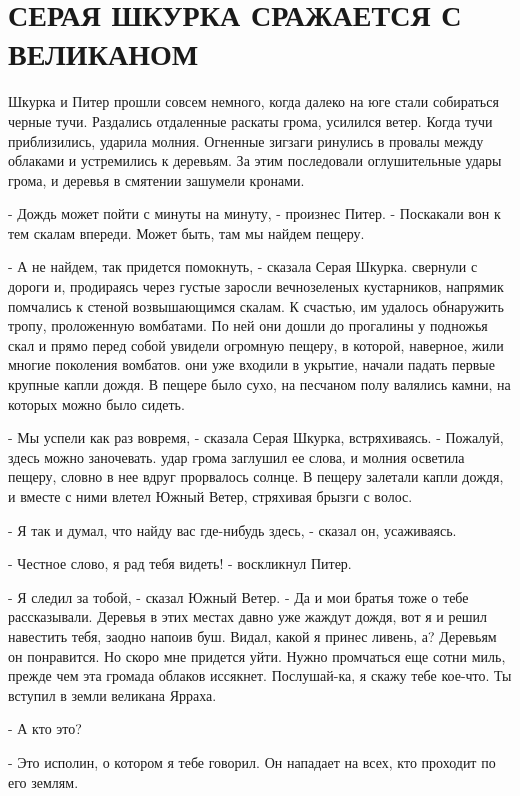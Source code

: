 \chapter{СЕРАЯ ШКУРКА СРАЖАЕТСЯ С ВЕЛИКАНОМ}
\par{} Шкурка и Питер прошли совсем немного, когда далеко на юге 
стали собираться черные тучи. Раздались отдаленные раскаты грома, 
усилился ветер. Когда тучи приблизились, ударила молния. Огненные 
зигзаги ринулись в провалы между облаками и устремились к деревьям. За 
этим последовали оглушительные удары грома, и деревья в смятении 
зашумели кронами.
\par- Дождь может пойти с минуты на минуту, - произнес Питер. - 
Поскакали вон к тем скалам впереди. Может быть, там мы найдем пещеру.
\par- А не найдем, так придется помокнуть, - сказала Серая Шкурка.
 свернули с дороги и, продираясь через густые заросли 
вечнозеленых кустарников, напрямик помчались к стеной возвышающимся 
скалам. К счастью, им удалось обнаружить тропу, проложенную вомбатами. 
По ней они дошли до прогалины у подножья скал и прямо перед собой 
увидели огромную пещеру, в которой, наверное, жили многие поколения 
вомбатов.
 они уже входили в укрытие, начали падать первые крупные 
капли дождя. В пещере было сухо, на песчаном полу валялись камни, на 
которых можно было сидеть.
\par- Мы успели как раз вовремя, - сказала Серая Шкурка, встряхиваясь. 
- Пожалуй, здесь можно заночевать.
 удар грома заглушил ее слова, и молния осветила пещеру, 
словно в нее вдруг прорвалось солнце. В пещеру залетали капли дождя, и 
вместе с ними влетел Южный Ветер, стряхивая брызги с волос.
\par- Я так и думал, что найду вас где-нибудь здесь, - сказал он, 
усаживаясь.
\par- Честное слово, я рад тебя видеть! - воскликнул Питер.
\par- Я следил за тобой, - сказал Южный Ветер. - Да и мои братья тоже 
о тебе рассказывали. Деревья в этих местах давно уже жаждут дождя, вот 
я и решил навестить тебя, заодно напоив буш. Видал, какой я принес 
ливень, а? Деревьям он понравится. Но скоро мне придется уйти. Нужно 
промчаться еще сотни миль, прежде чем эта громада облаков иссякнет. 
Послушай-ка, я скажу тебе кое-что. Ты вступил в земли великана Ярраха.
\par- А кто это?
\par- Это исполин, о котором я тебе говорил. Он нападает на всех, кто 
проходит по его землям.
